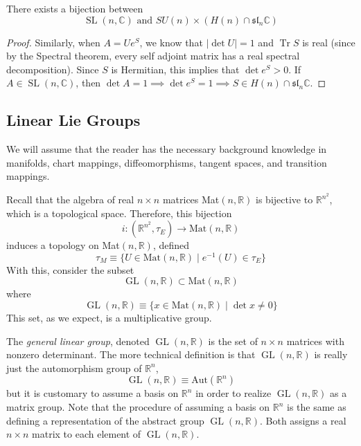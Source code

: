 \documentclass{article}
\DeclareMathOperator{\Tr}{Tr}
\DeclareMathOperator{\GL}{GL}
\DeclareMathOperator{\SL}{SL}
\begin{document}
    \begin{corollary}
    There exists a bijection between 
    \[\SL(n, \mathbb{C}) \text{ and } SU(n) \times (H(n) \cap \mathfrak{sl}_n \mathbb{C})\]
    \end{corollary}
    \begin{proof}
    Similarly, when $A = U e^S$, we know that $|\det{U}| = 1$ and $\Tr{S}$ is real (since by the Spectral theorem, every self adjoint matrix has a real spectral decomposition). Since $S$ is Hermitian, this implies that $\det{e^S} > 0$. If $A \in \SL(n, \mathbb{C})$, then $\det{A} = 1 \implies \det{e^S} = 1 \implies S \in H(n) \cap \mathfrak{sl}_n \mathbb{C}$. 
    \end{proof}

  \subsection{Linear Lie Groups}

    We will assume that the reader has the necessary background knowledge in manifolds, chart mappings, diffeomorphisms, tangent spaces, and transition mappings. 

    Recall that the algebra of real $n \times n$ matrices Mat$(n, \mathbb{R})$ is bijective to $\mathbb{R}^{n^2}$, which is a topological space. Therefore, this bijection 
    \[i:(\mathbb{R}^{n^2}, \tau_E) \longrightarrow \text{Mat}(n, \mathbb{R})\]
    induces a topology on Mat$(n, \mathbb{R})$, defined 
    \[\tau_M \equiv \{U \in \text{Mat}(n, \mathbb{R}) \; | \; e^{-1} (U) \in \tau_E\}\]
    With this, consider the subset
    \[\GL(n, \mathbb{R}) \subset \text{Mat}(n, \mathbb{R})\]
    where
    \[\GL(n, \mathbb{R}) \equiv \{x \in \text{Mat}(n, \mathbb{R}) \;|\; \det{x} \neq 0\}\]
    This set, as we expect, is a multiplicative group. 

    \begin{definition}
    The \textit{general linear group}, denoted $\GL(n, \mathbb{R})$ is the set of $n \times n$ matrices with nonzero determinant. The more technical definition is that $\GL(n, \mathbb{R})$ is really just the automorphism group of $\mathbb{R}^n$, 
    \[\GL(n, \mathbb{R}) \equiv \text{Aut}(\mathbb{R}^n)\]
    but it is customary to assume a basis on $\mathbb{R}^n$ in order to realize $\GL(n, \mathbb{R})$ as a matrix group. Note that the procedure of assuming a basis on $\mathbb{R}^n$ is the same as defining a representation of the abstract group $\GL(n, \mathbb{R})$. Both assigns a real $n \times n$ matrix to each element of $\GL(n, \mathbb{R})$. 
    \end{definition}
\end{document}
